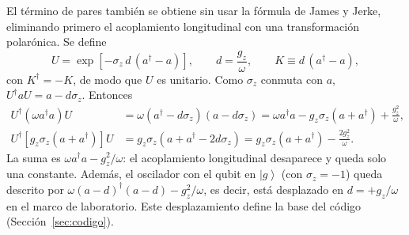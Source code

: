 \documentclass[11pt,a4paper]{article}
\newcommand{\ket}[1]{\left|#1\right\rangle}
\theoremstyle{definition}
\begin{document}
El término de pares también se obtiene sin usar la fórmula de James y Jerke, eliminando primero el acoplamiento longitudinal con una transformación polarónica. Se define
\begin{equation}
U=\exp\left[-\sigma_z\,d\,(a^{\dagger}-a)\right],\qquad d=\frac{g_z}{\omega},\qquad K\equiv d\,(a^{\dagger}-a),
\end{equation}
con $K^{\dagger}=-K$, de modo que $U$ es unitario. Como $\sigma_z$ conmuta con $a$, $U^{\dagger}aU=a-d\sigma_z$. Entonces
\begin{align}
U^{\dagger}\left(\omega a^{\dagger}a\right)U&=\omega\left(a^{\dagger}-d\sigma_z\right)\left(a-d\sigma_z\right)=\omega a^{\dagger}a-g_z\sigma_z(a+a^{\dagger})+\frac{g_z^2}{\omega},\\
U^{\dagger}\left[g_z\sigma_z(a+a^{\dagger})\right]U&=g_z\sigma_z\left(a+a^{\dagger}-2d\sigma_z\right)=g_z\sigma_z(a+a^{\dagger})-\frac{2g_z^2}{\omega}.
\end{align}
La suma es $\omega a^{\dagger}a-g_z^2/\omega$: el acoplamiento longitudinal desaparece y queda solo una constante. Además, el oscilador con el qubit en $\ket{g}$ (con $\sigma_z=-1$) queda descrito por $\omega(a-d)^{\dagger}(a-d)-g_z^2/\omega$, es decir, está desplazado en $d=+g_z/\omega$ en el marco de laboratorio. Este desplazamiento define la base del código (Sección~\ref{sec:codigo}).
\end{document}
